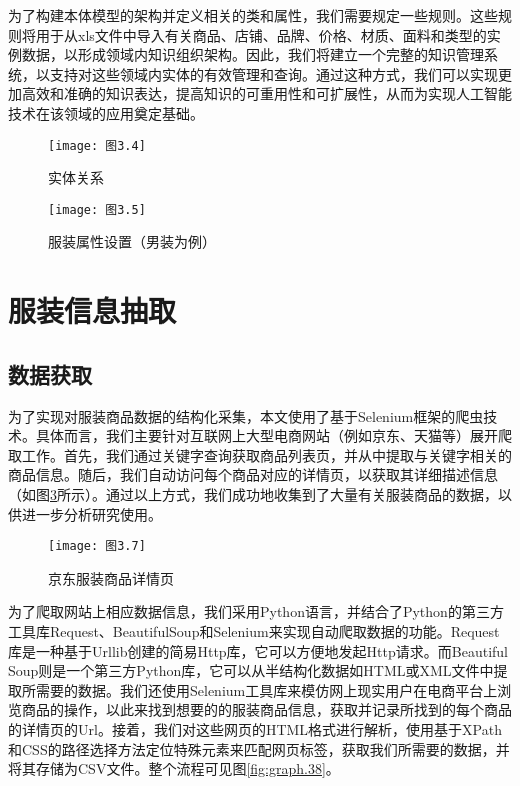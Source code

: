 \documentclass[bachelor_p]{hdu-thesis}
\begin{document}
为了构建本体模型的架构并定义相关的类和属性，我们需要规定一些规则。这些规则将用于从xls文件中导入有关商品、店铺、品牌、价格、材质、面料和类型的实例数据，以形成领域内知识组织架构。因此，我们将建立一个完整的知识管理系统，以支持对这些领域内实体的有效管理和查询。通过这种方式，我们可以实现更加高效和准确的知识表达，提高知识的可重用性和可扩展性，从而为实现人工智能技术在该领域的应用奠定基础。

\begin{figure}[h]
  \centering
  \texttt{[image: 图3.4]}
  \caption{实体关系}\label{fig:graph.34}
\end{figure}

\begin{figure}[h]
  \centering
  \texttt{[image: 图3.5]}
  \caption{服装属性设置（男装为例）}\label{fig:graph.35}
\end{figure}

\section{服装信息抽取}
\subsection{数据获取}

为了实现对服装商品数据的结构化采集，本文使用了基于Selenium框架的爬虫技术。具体而言，我们主要针对互联网上大型电商网站（例如京东、天猫等）展开爬取工作。首先，我们通过关键字查询获取商品列表页，并从中提取与关键字相关的商品信息。随后，我们自动访问每个商品对应的详情页，以获取其详细描述信息（如图\ref{fig:graph.37}所示）。通过以上方式，我们成功地收集到了大量有关服装商品的数据，以供进一步分析研究使用。

\begin{figure}[h]
  \centering
  \texttt{[image: 图3.7]}
  \caption{京东服装商品详情页}\label{fig:graph.37}
\end{figure}

为了爬取网站上相应数据信息，我们采用Python语言，并结合了Python的第三方工具库Request、BeautifulSoup和Selenium来实现自动爬取数据的功能。Request库是一种基于Urllib创建的简易Http库，它可以方便地发起Http请求。而Beautiful Soup则是一个第三方Python库，它可以从半结构化数据如HTML或XML文件中提取所需要的数据。我们还使用Selenium工具库来模仿网上现实用户在电商平台上浏览商品的操作，以此来找到想要的的服装商品信息，获取并记录所找到的每个商品的详情页的Url。接着，我们对这些网页的HTML格式进行解析，使用基于XPath和CSS的路径选择方法定位特殊元素来匹配网页标签，获取我们所需要的数据，并将其存储为CSV文件。整个流程可见图\ref{fig:graph.38}。
\end{document}
